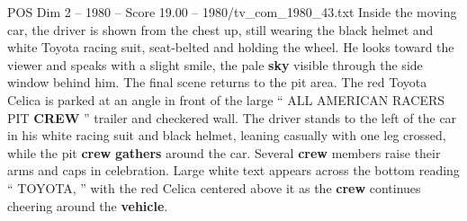\begin{textsample}{POS Dim 2 – 1980 – Score 19.00 – 1980/tv\_com\_1980\_43.txt}
Inside the moving car, the driver is shown from the chest up, still wearing the black helmet and white Toyota racing suit, seat-belted and holding the wheel.
He looks toward the viewer and speaks with a slight smile, the pale \textbf{sky} visible through the side window behind him.
The final scene returns to the pit area.
The red Toyota Celica is parked at an angle in front of the large “ ALL AMERICAN RACERS PIT \textbf{CREW} ” trailer and checkered wall.
The driver stands to the left of the car in his white racing suit and black helmet, leaning casually with one leg crossed, while the pit \textbf{crew} \textbf{gathers} around the car.
Several \textbf{crew} members raise their arms and caps in celebration.
Large white text appears across the bottom reading “ TOYOTA, ” with the red Celica centered above it as the \textbf{crew} continues cheering around the \textbf{vehicle}.

\end{textsample}
